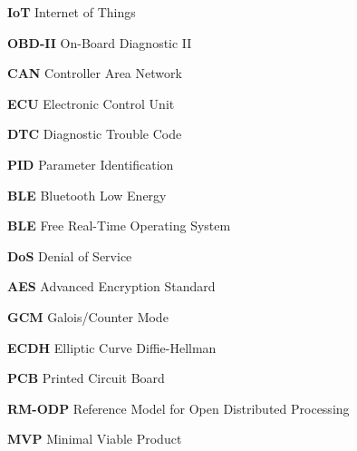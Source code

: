 \documentclass[
	12pt,				%
	openright,			%
	oneside,			%
	a4paper,			%
	english,			%
	french,				%
	spanish,			%
	brazil				%
	]{abntex2}
\begin{document}
\begin{siglas}
  \item[\textbf{IoT}] Internet of Things
  \item[\textbf{OBD-II}] On-Board Diagnostic II
  \item[\textbf{CAN}] Controller Area Network
  \item[\textbf{ECU}] Electronic Control Unit
  \item[\textbf{DTC}] Diagnostic Trouble Code
  \item[\textbf{PID}] Parameter Identification
  \item[\textbf{BLE}] Bluetooth Low Energy
  \item[\textbf{BLE}] Free Real-Time Operating System
  \item[\textbf{DoS}] Denial of Service
  \item[\textbf{AES}] Advanced Encryption Standard
  \item[\textbf{GCM}] Galois/Counter Mode
  \item[\textbf{ECDH}] Elliptic Curve Diffie-Hellman
  \item[\textbf{PCB}] Printed Circuit Board
  \item[\textbf{RM-ODP}] Reference Model for Open Distributed Processing
  \item[\textbf{MVP}] Minimal Viable Product
\end{siglas}


\tableofcontents*
\cleardoublepage


\textual








\end{document}
